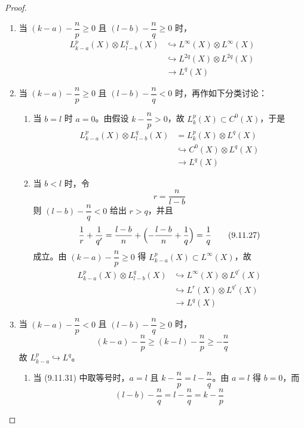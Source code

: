 \begin{proof}
\begin{enumerate}[label=\arabic*., leftmargin=2.2em]
\item 当 $(k-a)-\dfrac np\ge0$ 且 $(l-b)-\dfrac nq\ge0$ 时，
\begin{align}
  L^p_{k-a}(X)\otimes L^q_{l-b}(X)
  &\hookrightarrow L^\infty(X)\otimes L^\infty(X)
  \tag{9.11.20}\\
  &\hookrightarrow L^{2q}(X)\otimes L^{2q}(X)
  \tag{9.11.21}\\
  &\to L^q(X)
  \tag{9.11.22}
\end{align}
\item 当 $(k-a)-\dfrac np\ge0$ 且 $(l-b)-\dfrac nq<0$ 时，再作如下分类讨论：
  \begin{enumerate}[label=(\roman*), leftmargin=2.4em]
  \item 当 $b=l$ 时 $a=0$。由假设 $k-\dfrac np>0$，故 $L^p_k(X)\subset C^0(X)$，于是
\begin{align}
  L^p_{k-a}(X)\otimes L^q_{l-b}(X) &= L^p_k(X)\otimes L^q(X)
  \tag{9.11.23}\\
  &\hookrightarrow C^0(X)\otimes L^q(X)
  \tag{9.11.24}\\
  &\to L^q(X)
  \tag{9.11.25}
\end{align}
  \item 当 $b<l$ 时，令
\begin{equation}
  r = \frac{n}{l-b}
  \tag{9.11.26}
\end{equation}
则 $(l-b)-\dfrac nq<0$ 给出 $r>q$，并且
\begin{equation}
  \frac1r + \frac1{q'}
  = \frac{l-b}{n} + \Bigl(-\frac{l-b}{n} + \frac1q\Bigr)
  = \frac1q
  \tag{9.11.27}
\end{equation}
成立。由 $(k-a)-\dfrac np\ge0$ 得 $L^p_{k-a}(X)\subset L^\infty(X)$，故
\begin{align}
  L^p_{k-a}(X)\otimes L^q_{l-b}(X)
  &\hookrightarrow L^\infty(X)\otimes L^{q'}(X)
  \tag{9.11.28}\\
  &\hookrightarrow L^r(X)\otimes L^{q'}(X)
  \tag{9.11.29}\\
  &\to L^q(X)
  \tag{9.11.30}
\end{align}
  \end{enumerate}
\item 当 $(k-a)-\dfrac np<0$ 且 $(l-b)-\dfrac nq\ge0$ 时，
\begin{equation}
  (k-a)-\frac np \ge (k-l)-\frac np \ge -\frac nq
  \tag{9.11.31}
\end{equation}
故 $L^p_{k-a}\hookrightarrow L^q$。
  \begin{enumerate}[label=(\roman*), leftmargin=2.4em]
  \item 当 (9.11.31) 中取等号时，$a=l$ 且 $k-\dfrac np = l-\dfrac nq$。由 $a=l$ 得 $b=0$，而
\begin{equation}
  (l-b)-\frac nq = l-\frac nq = k-\frac np
  \tag{9.11.32}
\end{equation}


\end{enumerate}
\end{enumerate}
\end{proof}
